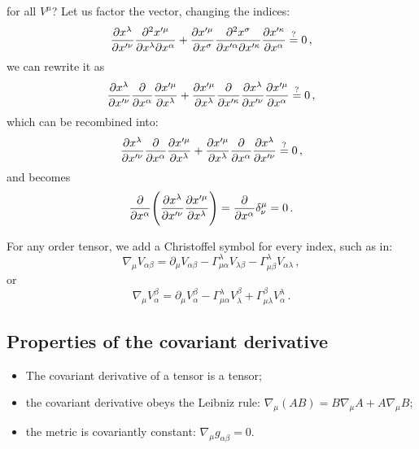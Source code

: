 \documentclass[main.tex]{subfiles}
\begin{document}
%
for all \(V^{\mu }\)? Let us factor the vector, changing the indices: 
%
\begin{equation}
    \pdv{x^{\lambda }}{x^{\prime \nu }} \pdv[2]{x^{\prime \mu }}{x^{\lambda }}{x^{\alpha }}
    + \pdv{x^{\prime \mu }}{x^{\sigma }} \pdv[2]{x^{ \sigma }}{x^{\prime \alpha }}{x^{\prime \kappa }} \pdv{x^{\prime \kappa }}{x^{ \alpha }} \overset{?}{=} 0
\,,
\end{equation}
%
we can rewrite it as 
%
\begin{equation}
    \pdv{x^{\lambda }}{x^{\prime \nu }} \pdv{}{x^{\alpha }}  \pdv{x^{\prime \mu }}{x^{\lambda }}
    + \pdv{x^{\prime \mu }}{x^{\lambda  }} 
    \pdv{}{x^{\prime \kappa }} 
    \pdv{x^{ \lambda }}{x^{\prime \nu }}
    \pdv{x^{\prime \mu }}{x^{ \alpha }} \overset{?}{=} 0
\,,
\end{equation}
%
which can be recombined into: 
%
\begin{equation}
    \pdv{x^{\lambda }}{x^{\prime \nu }} \pdv{}{x^{\alpha }}  \pdv{x^{\prime \mu }}{x^{\lambda }}
    + \pdv{x^{\prime \mu }}{x^{\lambda  }} 
    \pdv{}{x^{\alpha  }} 
    \pdv{x^{ \lambda }}{x^{\prime \nu }}
    \overset{?}{=} 0
\,,
\end{equation}
%
and becomes 
%
\begin{equation}
  \pdv{}{x^{\alpha }} \qty(\pdv{x^{\lambda }}{x^{\prime \nu }} \pdv{x^{\prime \mu }}{x^{\lambda }} ) 
  = \pdv{}{x^{\alpha }} \delta^{\mu}_{\nu }
  = 0
\,.
\end{equation}
%

For any order tensor,  we add a Christoffel symbol for every index, such as in: 
%
\begin{equation}
  \nabla_{\mu }V_{\alpha \beta }   
  = \partial_\mu V_{\alpha \beta } - \Gamma^{\lambda}_{\mu \alpha }V_{\lambda \beta }- \Gamma^{\lambda }_{\mu \beta }V_{\alpha \lambda }
\,,
\end{equation}
%
or 
%
\begin{equation}
    \nabla_{\mu }V_{\alpha}^{\beta }   
    = \partial_\mu V_{\alpha}^{\beta }
    - \Gamma^{\lambda}_{\mu \alpha }V_{\lambda}^{\beta }
    + \Gamma^{\beta }_{\mu \lambda  }V_{\alpha}^{\lambda }
\,.
\end{equation}
%

\subsection{Properties of the covariant derivative}

\begin{itemize}
    \item The covariant derivative of a tensor is a tensor;
    \item the covariant derivative obeys the Leibniz rule: \(\nabla_{\mu} (AB) = B \nabla_{\mu }A + A \nabla_{\mu }B\);
    \item the metric is covariantly constant: \(\nabla_{\mu }g_{\alpha \beta }=0\).
\end{itemize}
\end{document}
